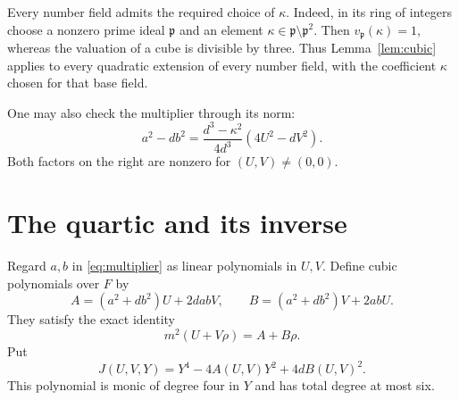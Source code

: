 \documentclass[11pt,a4paper]{article}
\begin{document}
Every number field admits the required choice of $\kappa$.
Indeed, in its ring of integers choose a nonzero prime ideal
$\mathfrak p$ and an element
$\kappa\in\mathfrak p\setminus\mathfrak p^2$.
Then $v_{\mathfrak p}(\kappa)=1$, whereas the valuation of a cube
is divisible by three. Thus Lemma~\ref{lem:cubic} applies to
every quadratic extension of every number field, with the
coefficient $\kappa$ chosen for that base field.

One may also check the multiplier through its norm:
\begin{equation}\label{eq:norm}
 a^2-db^2=\frac{d^3-\kappa^2}{4d^3}
                              (4U^2-dV^2).
\end{equation}
Both factors on the right are nonzero for $(U,V)\ne(0,0)$.

\section{The quartic and its inverse}

Regard $a,b$ in \eqref{eq:multiplier} as linear polynomials in
$U,V$. Define cubic polynomials over $F$ by
\begin{equation}\label{eq:AB}
 A=(a^2+db^2)U+2dabV,\qquad
 B=(a^2+db^2)V+2abU.
\end{equation}
They satisfy the exact identity
\begin{equation}\label{eq:square}
                  m^2(U+V\rho)=A+B\rho.
\end{equation}
Put
\begin{equation}\label{eq:quartic}
 J(U,V,Y)=Y^4-4A(U,V)Y^2+4dB(U,V)^2.
\end{equation}
This polynomial is monic of degree four in $Y$ and has total
degree at most six.
\end{document}
